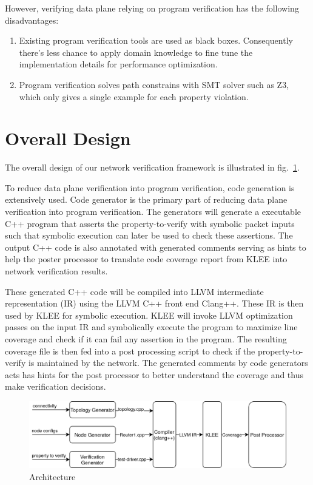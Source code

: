 \documentclass[letterpaper, 10 pt, conference]{ieeeconf}  %
\begin{document}
However, verifying data plane relying on program verification has the following disadvantages:

\begin{enumerate}
 \item Existing program verification tools are used as black boxes. Consequently there's less chance to apply domain knowledge to fine tune the implementation details for performance optimization.
 \item Program verification solves path constrains with SMT solver such as Z3, which only gives a single example for each property violation.
\end{enumerate}

\section{Overall Design}\label{sec:overall}
The overall design of our network verification framework is illustrated in fig.~\ref{fig:arch}. 

To reduce data plane verification into program verification, code generation is extensively used. 
Code generator is the primary part of reducing data plane verification into program verification. 
The generators will generate a executable C++ program that asserts the property-to-verify with symbolic packet inputs such that symbolic execution can later be used to check these assertions. 
The output C++ code is also annotated with generated comments serving as hints to help the poster processor to translate code coverage report from KLEE into network verification results.

These generated C++ code will be compiled into LLVM intermediate representation (IR) using the LLVM C++ front end Clang++. 
These IR is then used by KLEE for symbolic execution. KLEE will invoke LLVM optimization passes on the input IR and symbolically execute the program to maximize line coverage and check if it can fail any assertion in the program. 
The resulting coverage file is then fed into a post processing script to check if the property-to-verify is maintained by the network. 
The generated comments by code generators acts has hints for the post processor to better understand the coverage and thus make verification decisions.

\begin{figure}[]
  \centering
  \includegraphics[width=\linewidth]{overview.png}
  \caption{Architecture}
  \label{fig:arch}
\end{figure}
\end{document}
